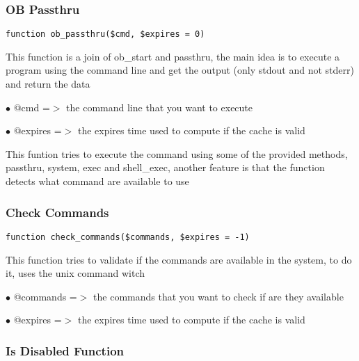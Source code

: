 \documentclass[a4paper]{article}
\begin{document}
\hypertarget{toc123}{}
\subsubsection{OB Passthru}

\begin{lstlisting}
function ob_passthru($cmd, $expires = 0)
\end{lstlisting}

This function is a join of ob\_start and passthru, the main idea
is to execute a program using the command line and get the
output (only stdout and not stderr) and return the data

\begin{compactitem}
\item[\color{myblue}$\bullet$] @cmd     =$>$ the command line that you want to execute
\item[\color{myblue}$\bullet$] @expires =$>$ the expires time used to compute if the cache is valid
\end{compactitem}

This funtion tries to execute the command using some of the
provided methods, passthru, system, exec and shell\_exec, another
feature is that the function detects what command are available
to use

\hypertarget{toc124}{}
\subsubsection{Check Commands}

\begin{lstlisting}
function check_commands($commands, $expires = -1)
\end{lstlisting}

This function tries to validate if the commands are available
in the system, to do it, uses the unix command witch

\begin{compactitem}
\item[\color{myblue}$\bullet$] @commands =$>$ the commands that you want to check if are they available
\item[\color{myblue}$\bullet$] @expires  =$>$ the expires time used to compute if the cache is valid
\end{compactitem}

\hypertarget{toc125}{}
\subsubsection{Is Disabled Function}
\end{document}
